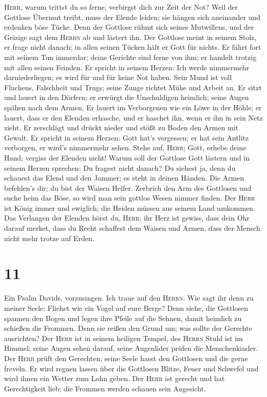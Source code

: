  \textsc{Herr}, warum trittst du so ferne, verbirgst dich
zur Zeit der Not?  Weil der Gottlose Übermut treibt, muss
der Elende leiden; sie hängen sich aneinander und erdenken böse Tücke.
 Denn der Gottlose rühmt sich seines Mutwillens, und der
Geizige sagt dem \textsc{Herrn} ab und lästert ihn.  Der
Gottlose meint in seinem Stolz, er frage nicht danach; in allen seinen
Tücken hält er Gott für nichts.  Er fährt fort mit seinem
Tun immerdar; deine Gerichte sind ferne von ihm; er handelt trotzig mit
allen seinen Feinden.  Er spricht in seinem Herzen: Ich
werde nimmermehr darniederliegen; es wird für und für keine Not haben.
 Sein Mund ist voll Fluchens, Falschheit und Trugs; seine
Zunge richtet Mühe und Arbeit an.  Er sitzt und lauert in
den Dörfern; er erwürgt die Unschuldigen heimlich; seine Augen spähen
nach dem Armen.  Er lauert im Verborgenen wie ein Löwe in
der Höhle; er lauert, dass er den Elenden erhasche, und er haschet ihn,
wenn er ihn in sein Netz zieht.  Er zerschlägt und drückt
nieder und stößt zu Boden den Armen mit Gewalt.  Er
spricht in seinem Herzen: Gott hat's vergessen; er hat sein Antlitz
verborgen, er wird's nimmermehr sehen.  Stehe auf,
\textsc{Herr}; Gott, erhebe deine Hand; vergiss der Elenden nicht!
 Warum soll der Gottlose Gott lästern und in seinem
Herzen sprechen: Du fragest nicht danach?  Du siehest ja,
denn du schauest das Elend und den Jammer; es steht in deinen Händen.
Die Armen befehlen's dir; du bist der Waisen Helfer. 
Zerbrich den Arm des Gottlosen und suche heim das Böse, so wird man sein
gottlos Wesen nimmer finden.  Der \textsc{Herr} ist König
immer und ewiglich; die Heiden müssen aus seinem Land umkommen.
 Das Verlangen der Elenden hörst du, \textsc{Herr}; ihr
Herz ist gewiss, dass dein Ohr darauf merket,  dass du
Recht schaffest dem Waisen und Armen, dass der Mensch nicht mehr trotze
auf Erden.

\hypertarget{section-10}{%
\section{11}\label{section-10}}

 Ein Psalm Davids, vorzusingen. Ich traue auf den
\textsc{Herrn}. Wie sagt ihr denn zu meiner Seele: Fliehet wie ein Vogel
auf eure Berge?  Denn siehe, die Gottlosen spannen den
Bogen und legen ihre Pfeile auf die Sehnen, damit heimlich zu schießen
die Frommen.  Denn sie reißen den Grund um; was sollte der
Gerechte ausrichten?  Der \textsc{Herr} ist in seinem
heiligen Tempel, des \textsc{Herrn} Stuhl ist im Himmel; seine Augen
sehen darauf, seine Augenlider prüfen die Menschenkinder. 
Der \textsc{Herr} prüft den Gerechten; seine Seele hasst den Gottlosen
und die gerne freveln.  Er wird regnen lassen über die
Gottlosen Blitze, Feuer und Schwefel und wird ihnen ein Wetter zum Lohn
geben.  Der \textsc{Herr} ist gerecht und hat
Gerechtigkeit lieb; die Frommen werden schauen sein Angesicht.

